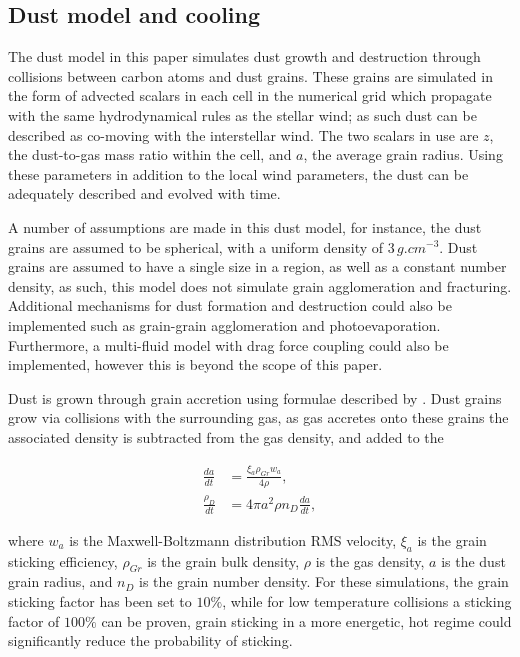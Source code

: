 \subsection{Dust model and cooling}

The dust model in this paper simulates dust growth and destruction through collisions between carbon atoms and dust grains. These grains are simulated in the form of advected scalars in each cell in the numerical grid which propagate with the same hydrodynamical rules as the stellar wind; as such dust can be described as co-moving with the interstellar wind. The two scalars in use are $z$, the dust-to-gas mass ratio within the cell, and $a$, the average grain radius. Using these parameters in addition to the local wind parameters, the dust can be adequately described and evolved with time. %

A number of assumptions are made in this dust model, for instance, the dust grains are assumed to be spherical, with a uniform density of $3 \, \si{g.cm^{-3}}$. Dust grains are assumed to have a single size in a region, as well as a constant number density, as such, this model does not simulate grain agglomeration and fracturing.
Additional mechanisms for dust formation and destruction could also be implemented such as grain-grain agglomeration and photoevaporation.
Furthermore, a multi-fluid model with drag force coupling could also be implemented, however this is beyond the scope of this paper.

Dust is grown through grain accretion using formulae described by \parencite{spitzer_jr._physical_2008}. Dust grains grow via collisions with the surrounding gas, as gas accretes onto these grains the associated density is subtracted from the gas density, and added to the 


\begin{subequations}
  \begin{align}
        \frac{da}{dt} & = \frac{\xi_a \rho_{Gr} w_a}{4 \rho} , \\
    \frac{\rho_D}{dt} & = 4 \pi a^2 \rho n_D \frac{da}{dt}   , 
  \end{align}
\end{subequations}

where $w_a$ is the Maxwell-Boltzmann distribution RMS velocity, $\xi_a$ is the grain sticking efficiency, $\rho_{Gr}$ is the grain bulk density, $\rho$ is the gas density, $a$ is the dust grain radius, and $n_D$ is the grain number density. For these simulations, the grain sticking factor has been set to $10\%$, while for low temperature collisions a sticking factor of $100\%$ can be proven, grain sticking in a more energetic, hot regime could significantly reduce the probability of sticking. 

